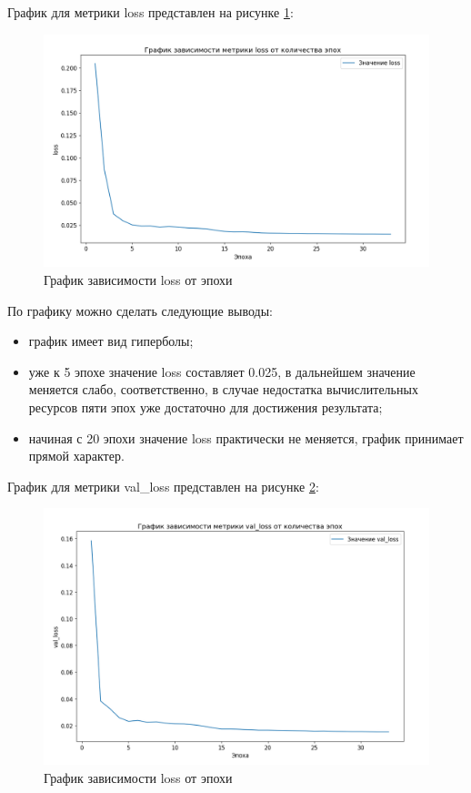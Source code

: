 График для метрики loss представлен на рисунке \ref{tech::loss}:
\FloatBarrier
\begin{figure}[h]	
	\begin{center}
		\includegraphics[width=\linewidth]{inc/png/loss.png}
	\end{center}
	\captionsetup{justification=centering}
	\caption{График зависимости loss от эпохи}
	\label{tech::loss}
\end{figure}
\FloatBarrier

По графику можно сделать следующие выводы:
\begin{itemize}
	\item график имеет вид гиперболы;
	\item уже к 5 эпохе значение loss составляет 0.025, в дальнейшем значение меняется слабо, соответственно, в случае недостатка вычислительных ресурсов пяти эпох уже достаточно для достижения результата;
	\item начиная с 20 эпохи значение loss практически не меняется, график принимает прямой характер.
\end{itemize}

\newpage
График для метрики val\_loss представлен на рисунке \ref{tech::val_loss}:
\FloatBarrier
\begin{figure}[h]	
	\begin{center}
		\includegraphics[width=\linewidth]{inc/png/val_loss.png}
	\end{center}
	\captionsetup{justification=centering}
	\caption{График зависимости loss от эпохи}
	\label{tech::val_loss}
\end{figure}
\FloatBarrier

